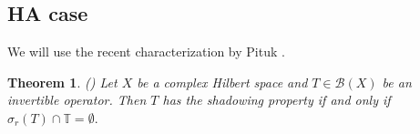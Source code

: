\documentclass[11pt]{amsart}
\theoremstyle{plain}
\newtheorem{teo}{Theorem}
\theoremstyle{remark}
\theoremstyle{plain}
\begin{document}

\subsection{HA case}  We will use the recent characterization by Pituk \cite{Pituk}.

\begin{teo}\label{Pituk} \normalfont (\cite[Theorem 1.7]{Pituk}) Let $X$ be a complex Hilbert space and $T\in \mathcal{B}(X)$ be an invertible operator. Then $T$ has the shadowing property if and only if $\sigma_r(T)\cap \mathbb{T}=\emptyset.$ 
\end{teo}
\end{document}
